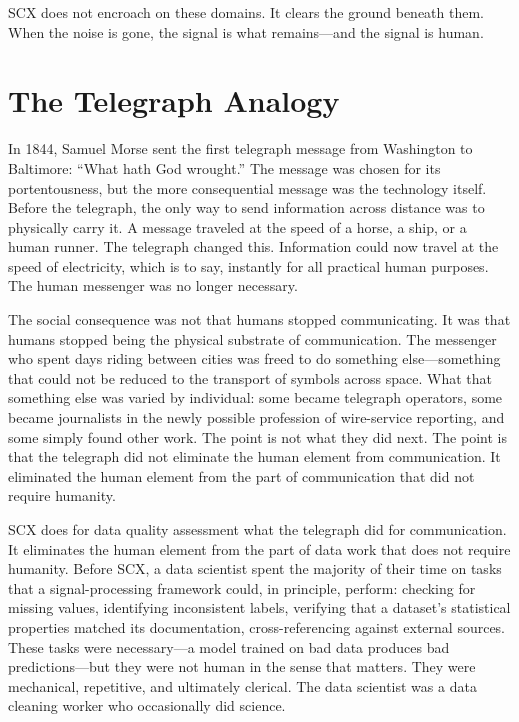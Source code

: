 \documentclass[12pt,a4paper]{article}
\begin{document}
SCX does not encroach on these domains. It clears the ground beneath them. When the noise is gone, the signal is what remains---and the signal is human.

\section{The Telegraph Analogy}

In 1844, Samuel Morse sent the first telegraph message from Washington to Baltimore: ``What hath God wrought.'' The message was chosen for its portentousness, but the more consequential message was the technology itself. Before the telegraph, the only way to send information across distance was to physically carry it. A message traveled at the speed of a horse, a ship, or a human runner. The telegraph changed this. Information could now travel at the speed of electricity, which is to say, instantly for all practical human purposes. The human messenger was no longer necessary.

The social consequence was not that humans stopped communicating. It was that humans stopped being the physical substrate of communication. The messenger who spent days riding between cities was freed to do something else---something that could not be reduced to the transport of symbols across space. What that something else was varied by individual: some became telegraph operators, some became journalists in the newly possible profession of wire-service reporting, and some simply found other work. The point is not what they did next. The point is that the telegraph did not eliminate the human element from communication. It eliminated the human element from the part of communication that did not require humanity.

SCX does for data quality assessment what the telegraph did for communication. It eliminates the human element from the part of data work that does not require humanity. Before SCX, a data scientist spent the majority of their time on tasks that a signal-processing framework could, in principle, perform: checking for missing values, identifying inconsistent labels, verifying that a dataset's statistical properties matched its documentation, cross-referencing against external sources. These tasks were necessary---a model trained on bad data produces bad predictions---but they were not human in the sense that matters. They were mechanical, repetitive, and ultimately clerical. The data scientist was a data cleaning worker who occasionally did science.
\end{document}
